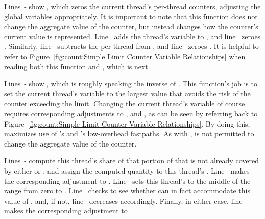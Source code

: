 \begin{lineref}
Lines~- show ,
which zeros the current thread's
per-thread counters, adjusting the global variables appropriately.
It is important to note that this function does not change the aggregate
value of the counter, but instead changes how the counter's current value
is represented.
Line~ adds the thread's  variable to ,
and line~ zeroes .
Similarly, line~ subtracts the per-thread  from
, and line~ zeroes .
It is helpful to refer to
Figure~\ref{fig:count:Simple Limit Counter Variable Relationships}
when reading both this function and , which is next.
\end{lineref}

\begin{lineref}
Lines~- show ,
which is roughly speaking
the inverse of .
This function's job is to set the current thread's
 variable to the largest value that avoids the risk
of the counter exceeding the  limit.
Changing the current thread's  variable of course
requires corresponding adjustments to , 
and , as can be seen by referring back to
Figure~\ref{fig:count:Simple Limit Counter Variable Relationships}.
By doing this,  maximizes use of
's and 's low-overhead fastpaths.
As with ,  is not permitted
to change the aggregate value of the counter.

Lines~- compute this thread's share of
that portion of
 that is not already covered by either
 or , and assign the
computed quantity to this thread's .
Line~ makes the corresponding adjustment to .
Line~ sets this thread's  to the middle of the range
from zero to .
Line~ checks to see whether  can in fact accommodate
this value of , and, if not,
line~ decreases 
accordingly.
Finally, in either case,
line~ makes the corresponding adjustment to
.
\end{lineref}

